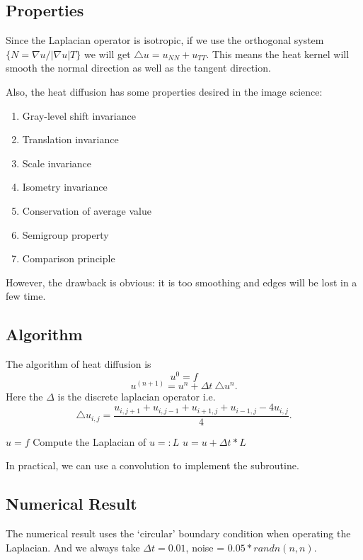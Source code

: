 \documentclass{article}
\begin{document}
\subsection{Properties}
Since the Laplacian operator is isotropic, if we use the orthogonal system $\{N = \nabla u / |
\nabla u| T\}$ we will get $\triangle u = u_{NN} + u_{TT}$. This means the heat kernel will smooth the normal direction as well as the tangent direction.

Also, the heat diffusion has some properties desired in the image science:
\begin{enumerate}
\item Gray-level shift invariance
\item Translation invariance
\item Scale invariance 
\item Isometry invariance
\item Conservation of average value
\item Semigroup property
\item Comparison principle
\end{enumerate}

However, the drawback is obvious: it is too smoothing and edges will be lost in a few time.

\subsection{Algorithm}
The algorithm of heat diffusion is 
$$u^0 = f$$
$$u^{(n+1)} = u^{n} + \Delta t~\triangle u^n.$$
Here the $\Delta$ is the discrete laplacian operator i.e.
$$\triangle u_{i,j} = \frac{u_{i,j+1} + u_{i,j-1} + u_{i+1,j} + u_{i-1,j} - 4u_{i,j}}{4}.$$

\begin{algorithm}
\caption{$u = heat(f,T,\Delta t)$}
\begin{algorithmic}[1]
\STATE $u =f$
\STATE Compute the Laplacian of $u=:L$
\STATE $u = u + \Delta t * L$
\ENDFOR
\end{algorithmic}
\end{algorithm}
In practical, we can use a convolution to implement the subroutine.

\subsection{Numerical Result}
The numerical result uses the `circular' boundary condition when operating the Laplacian. And we always take $\Delta t = 0.01$, noise = $0.05 * randn(n,n)$.
\end{document}
